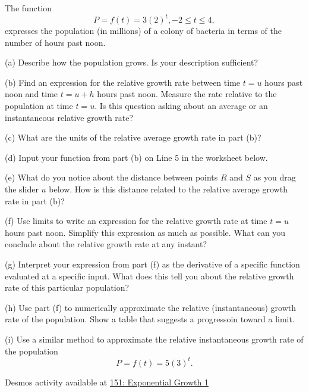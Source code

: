 \documentclass{ximera}
\begin{document}
\begin{question}  \label{Qdrg5h888}
The function 
\[
        P = f(t) = 3(2)^t , -2\leq t \leq 4 ,
\] 
expresses the population (in millions) of a colony of bacteria in terms of the number of hours past noon.

(a) Describe how the population grows. Is your description sufficient?

(b) Find an expression for the relative growth rate between time $t=u$ hours past noon and time $t=u+h$ hours past noon. Measure the rate relative to the population at time $t=u$. Is this question asking about an average or an instantaneous relative growth rate?

(c) What are the units of the relative average growth rate in part (b)?

(d) Input your function from part (b) on Line 5 in the worksheet below. 

(e) What do you notice about the distance between points $R$ and $S$ as you drag the slider $u$ below. How is this distance related to the relative average growth rate in part (b)?

(f) Use limits to write an expression for the relative growth rate at time $t=u$ hours past noon. Simplify this expression as much as possible.  What can you conclude about the relative growth rate at any instant?

(g) Interpret your expression from part (f) as the derivative of a specific function evaluated at a specific input. What does this tell you about the relative growth rate of this particular population?

(h) Use part (f) to numerically approximate the relative (instantaneous) growth rate of the population. Show a table that suggests a progressoin toward a limit.

(i) Use a similar method to approximate the relative instantaneous growth rate of the population
\[
   P = f(t) = 5 (3)^t .
\]



\begin{onlineOnly}
    \begin{center}
\end{center}
\end{onlineOnly}


Desmos activity available at \href{https://www.desmos.com/calculator/omjbec2hpu}{151: Exponential Growth 1}
\end{question}
\end{document}
